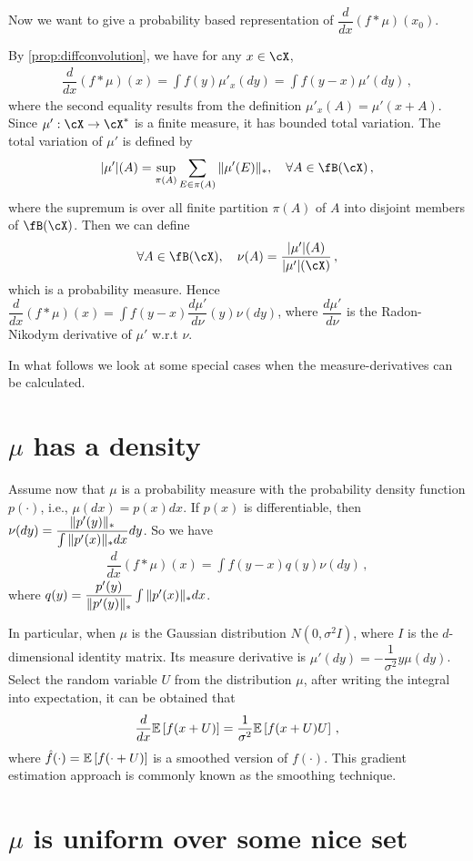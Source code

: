 \documentclass[11pt,letterpaper,english]{article}
\newcommand{\Borel}{\fB}
\begin{document}
Now we want to give a probability based representation of $\dfrac{d}{dx} (f*\mu) (x_0)$.

By \cref{prop:diffconvolution}, we have for any $x\in \cX$,
\begin{align*}
\dfrac{d}{dx} (f*\mu) (x) = \int f(y)\mu'_{x}(dy)
= \int f(y-x)\mu'(dy) \,,
\end{align*}
where the second equality results from the definition $\mu'_{x}(A)=\mu'(x+A)$. 
Since $\mu':\cX\to \cX^*$ is a finite measure, it has bounded total variation. The total variation of $\mu'$ is defined by
\begin{align*}
\vert \mu' \vert (A) = \sup_{\pi(A)} \sum_{E\in \pi(A)} \norm{\mu'(E)}_*, \quad \forall A \in \Borel(\cX) \,,
\end{align*}
where the supremum is over all finite partition $\pi(A)$ of $A$ into disjoint members of $\Borel(\cX)$.
Then we can define 
\begin{align*}
\forall A \in \Borel(\cX), \quad
\nu(A) = \dfrac{\vert \mu' \vert (A)}{\vert \mu' \vert (\cX)}\,,
\end{align*}
which is a probability measure. Hence 
$\dfrac{d}{dx} (f*\mu) (x) =  \int f(y-x) \dfrac{d\mu'}{d\nu}(y) \nu(dy)$, where $\dfrac{d\mu'}{d\nu}$ is the Radon-Nikodym derivative of $\mu'$ w.r.t $\nu$.

In what follows we look at some special cases when the measure-derivatives can be calculated.
\section{$\mu$ has a density}
Assume now that $\mu$ is a probability measure with the probability density function $p(\cdot)$, i.e., $\mu(dx) = p(x)dx$. If $p(x)$ is differentiable, then
$\nu(dy) = \dfrac{\|p'(y)\|_*}{\int \|p'(x)\|_*dx}dy$.
So we have
\begin{align*}
\dfrac{d}{dx} (f*\mu) (x) =  \int f(y-x) q(y) \nu (dy)\,,
\end{align*}
where $q(y) = \dfrac{p'(y)}{\|p'(y)\|_*}\int \|p'(x)\|_*dx$.

In particular, when $\mu$ is the Gaussian distribution $N(0, \sigma^2 I)$, where $I$ is the $d$-dimensional identity matrix.  Its measure derivative is
$\mu'(dy) = -\dfrac{1}{\sigma^2}y\mu(dy)$.
Select the random variable $U$ from the distribution $\mu$, 
after writing the integral into expectation, it can be obtained that 
\begin{align*}
\dfrac{d}{dx} \mathbb{E}\left[f(x+U)\right] = \dfrac{1}{\sigma^2}\mathbb{E}\left[f(x+U)U\right] \,,
\end{align*}
where $\hat{f}(\cdot)=\mathbb{E}\left[f(\cdot+U)\right]$ is a smoothed version of $f(\cdot)$. This gradient estimation approach is commonly known as the smoothing technique.

\section{$\mu$ is uniform over some nice set}
\end{document}
